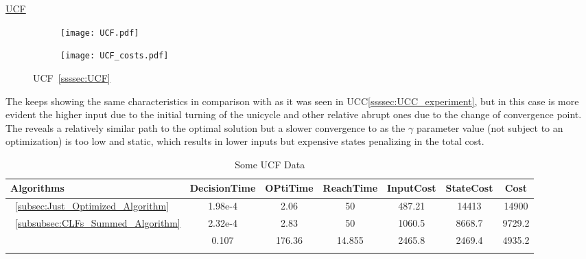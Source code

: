 \underline{UCF}
\label{ssssec:UCF_experiments} %


\begin{figure}[htbp]
  \begin{subfigure}{0.55\textwidth}
    \centering
    \texttt{[image: UCF.pdf]}
  \label{fig:UCF_CostEvol}
  \end{subfigure}
  \begin{subfigure}{0.6\textwidth}
    \centering
    \texttt{[image: UCF\_costs.pdf]}
  \label{fig:UCF_trajectory}
  \end{subfigure}
  \caption{UCF~\ref{ssssec:UCF}}
\label{fig:UCFTrajectory_and_CostEvol}
\end{figure}



The  keeps showing the same characteristics in comparison with  as it was seen in UCC\ref{ssssec:UCC_experiment}, but in this case is more evident the higher input due to the initial turning of the unicycle and other relative abrupt ones due to the change of convergence point. The  reveals a relatively similar path to the optimal solution but a slower convergence to \txtref as the \(\gamma\) parameter value (not subject to an optimization) is too low and static, which results in lower inputs but expensive states penalizing in the total cost. \\ 

\vspace{5em}


  \bgroup
 \begin{xltabular}{\textwidth}{|l|cccccc|}
   \toprule
   Algorithms   & DecisionTime & OPtiTime & ReachTime  & InputCost   & StateCost & Cost           \\
   \midrule
    ~\ref{subsec:Just_Optimized_Algorithm}           & 1.98e-4 & 2.06 & 50 & 487.21 & 14413 & 14900 \\
    ~\ref{subsubsec:CLFs_Summed_Algorithm}        & 2.32e-4 & 2.83 & 50 & 1060.5 & 8668.7 & 9729.2 \\
                                                      & 0.107   &176.36&14.855&2465.8& 2469.4 & 4935.2 \\
    \midrule
    \caption{Some UCF Data}
    \label{tab:Some_UCF_Data}\\
   \end{xltabular}
 \egroup

